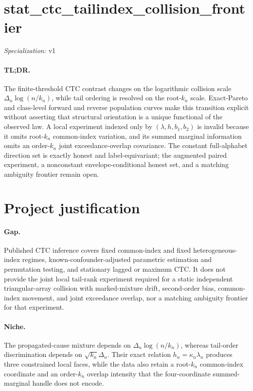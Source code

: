 \documentclass{article}
\begin{document}
\sloppy

\section*{stat\_\allowbreak{}ctc\_\allowbreak{}tailindex\_\allowbreak{}collision\_\allowbreak{}frontier}

\noindent\textit{Specialization:} v1\par

\paragraph{TL;DR.} The finite-threshold CTC contrast changes on the logarithmic collision scale \(\Delta_n\log(n/k_n)\), while tail ordering is resolved on the root-\(k_n\) scale.  Exact-Pareto and class-level forward and reverse population curves make this transition explicit without asserting that structural orientation is a unique functional of the observed law.  A local experiment indexed only by \((\lambda,h,b_1,b_2)\) is invalid because it omits root-\(k_n\) common-index variation, and its summed marginal information omits an order-\(k_n\) joint exceedance-overlap covariance.  The constant full-alphabet direction set is exactly honest and label-equivariant; the augmented paired experiment, a nonconstant envelope-conditional honest set, and a matching ambiguity frontier remain open.

\section{Project justification}

\paragraph{Gap.} Published CTC inference covers fixed common-index and fixed heterogeneous-index regimes, known-confounder-adjusted parametric estimation and permutation testing, and stationary lagged or maximum CTC.  It does not provide the joint local tail-rank experiment required for a static independent triangular-array collision with marked-mixture drift, second-order bias, common-index movement, and joint exceedance overlap, nor a matching ambiguity frontier for that experiment.

\paragraph{Niche.} The propagated-cause mixture depends on \(\Delta_n\log(n/k_n)\), whereas tail-order discrimination depends on \(\sqrt{k_n}\Delta_n\).  Their exact relation \(h_n=\kappa_n\lambda_n\) produces three constrained local faces, while the data also retain a root-\(k_n\) common-index coordinate and an order-\(k_n\) overlap intensity that the four-coordinate summed-marginal handle does not encode.
\end{document}
